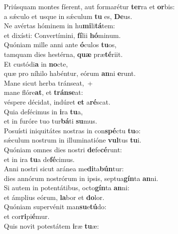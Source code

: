 \evenverse Priúsquam montes fíerent, aut formarétur \textbf{ter}ra et \textbf{or}bis:~\*\\
\evenverse a sǽculo et usque in sǽculum \textbf{tu} es, \textbf{De}us.\\
\oddverse Ne avértas hóminem in hu\textbf{mi}li\textbf{tá}tem:~\*\\
\oddverse et dixísti: Convertímini, \textbf{fí}lii \textbf{hó}minum.\\
\evenverse Quóniam mille anni ante \textbf{ó}culos \textbf{tu}os,~\*\\
\evenverse tamquam dies hestérna, \textbf{quæ} præ\textbf{té}riit.\\
\oddverse Et custódi\textbf{a} in \textbf{no}cte,~\*\\
\oddverse quæ pro níhilo habéntur, eórum \textbf{an}ni \textbf{e}runt.\\
\evenverse Mane sicut herba tránseat,~+\\
\evenverse  mane flóre\textbf{at}, et \textbf{trán}\textbf{se}at:~\*\\
\evenverse véspere décidat, indúret \textbf{et} a\textbf{ré}scat.\\
\oddverse Quia defécimus in \textbf{i}ra \textbf{tu}a,~\*\\
\oddverse et in furóre tuo tur\textbf{bá}ti \textbf{su}mus.\\
\evenverse Posuísti iniquitátes nostras in con\textbf{spé}ctu \textbf{tu}o:~\*\\
\evenverse sǽculum nostrum in illuminatióne \textbf{vul}tus \textbf{tu}i.\\
\oddverse Quóniam omnes dies nostri \textbf{de}fe\textbf{cé}runt:~\*\\
\oddverse et in ira \textbf{tu}a de\textbf{fé}cimus.\\
\evenverse Anni nostri sicut aránea me\textbf{di}ta\textbf{bún}tur:~\*\\
\evenverse dies annórum nostrórum in ipsis, septua\textbf{gín}ta \textbf{an}ni.\\
\oddverse Si autem in potentátibus, octo\textbf{gín}ta \textbf{an}ni:~\*\\
\oddverse et ámplius eórum, \textbf{la}bor et \textbf{do}lor.\\
\evenverse Quóniam supervénit man\textbf{su}e\textbf{tú}do:~\*\\
\evenverse et cor\textbf{ri}pi\textbf{é}mur.\\
\oddverse Quis novit potestátem \textbf{i}ræ \textbf{tu}æ:~\*\\
